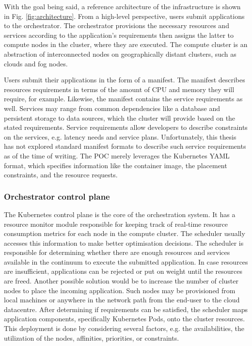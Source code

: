 With the goal being said, a reference architecture of the infrastructure is shown in Fig. \ref{fig:architecture}. From a high-level perspective, users submit applications to the orchestrator. The orchestrator provisions the necessary resources and services according to the application's requirements then assigns the latter to compute nodes in the cluster, where they are executed. The compute cluster is an abstraction of interconnected nodes on geographically distant clusters, such as clouds and fog nodes.

Users submit their applications in the form of a manifest. The manifest describes resources requirements in terms of the amount of CPU and memory they will require, for example. Likewise, the manifest contains the service requirements as well. Services may range from common dependencies like a database and persistent storage to data sources, which the cluster will provide based on the stated requirements. Service requirements allow developers to describe constraints on the services, e.g. latency needs and service plans. Unfortunately, this thesis has not explored standard manifest formats to describe such service requirements as of the time of writing. The POC merely leverages the Kubernetes YAML format, which specifies information like the container image, the placement constraints, and the resource requests.

\subsubsection{Orchestrator control plane}

The Kubernetes control plane is the core of the orchestration system. It has a resource monitor module responsible for keeping track of real-time resource consumption metrics for each node in the compute cluster. The scheduler usually accesses this information to make better optimisation decisions. The scheduler is responsible for determining whether there are enough resources and services available in the continuum to execute the submitted application. In case resources are insufficient, applications can be rejected or put on weight until the resources are freed. Another possible solution would be to increase the number of cluster nodes to place the incoming application. Such nodes may be provisioned from local machines or anywhere in the network path from the end-user to the cloud datacentre. After determining if requirements can be satisfied, the scheduler maps application components, specifically Kubernetes Pods, onto the cluster resources. This deployment is done by considering several factors, e.g. the availabilities, the utilization of the nodes, affinities, priorities, or constraints.

